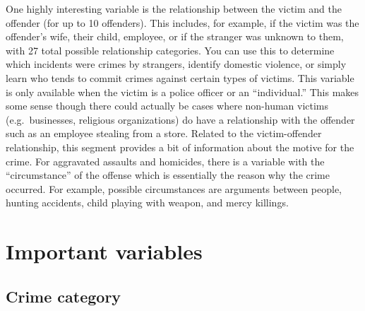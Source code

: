 \documentclass[
  12pt,
  openany]{book}
\begin{document}
One highly interesting variable is the relationship between the victim and the offender (for up to 10 offenders). This includes, for example, if the victim was the offender's wife, their child, employee, or if the stranger was unknown to them, with 27 total possible relationship categories. You can use this to determine which incidents were crimes by strangers, identify domestic violence, or simply learn who tends to commit crimes against certain types of victims. This variable is only available when the victim is a police officer or an ``individual.'' This makes some sense though there could actually be cases where non-human victims (e.g.~businesses, religious organizations) do have a relationship with the offender such as an employee stealing from a store. Related to the victim-offender relationship, this segment provides a bit of information about the motive for the crime. For aggravated assaults and homicides, there is a variable with the ``circumstance'' of the offense which is essentially the reason why the crime occurred. For example, possible circumstances are arguments between people, hunting accidents, child playing with weapon, and mercy killings.

\hypertarget{important-variables-3}{%
\section{Important variables}\label{important-variables-3}}

\hypertarget{crime-category-1}{%
\subsection{Crime category}\label{crime-category-1}}
\end{document}
